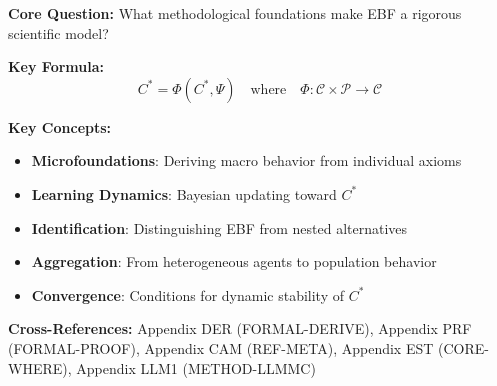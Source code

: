 \begin{abstract}
This appendix addresses five fundamental methodological challenges in constructing
EBF: (1) Microfoundations---how axioms derive from primitive assumptions;
(2) Learning Theory---how agents form and update expectations;
(3) Dynamic Adjustment---how systems converge to reference structure $C^*$;
(4) Heterogeneity and Aggregation---how individual differences scale;
(5) Identification and Model Comparison---how to distinguish EBF from alternatives.
These foundations ensure EBF meets rigorous standards of economic methodology.
\end{abstract}

\begin{tcolorbox}[colback=blue!5!white, colframe=blue!75!black,
    title=Quick Reference: METHOD-CONSTRUCT]

\textbf{Core Question:} What methodological foundations make EBF a rigorous scientific model?

\textbf{Key Formula:}
\begin{equation}
C^* = \Phi(C^*, \Psi) \quad \text{where} \quad \Phi: \mathcal{C} \times \mathcal{P} \to \mathcal{C}
\end{equation}

\textbf{Key Concepts:}
\begin{itemize}[nosep]
\item \textbf{Microfoundations}: Deriving macro behavior from individual axioms
\item \textbf{Learning Dynamics}: Bayesian updating toward $C^*$
\item \textbf{Identification}: Distinguishing EBF from nested alternatives
\item \textbf{Aggregation}: From heterogeneous agents to population behavior
\item \textbf{Convergence}: Conditions for dynamic stability of $C^*$
\end{itemize}

\textbf{Cross-References:} Appendix DER (FORMAL-DERIVE), Appendix PRF (FORMAL-PROOF),
Appendix CAM (REF-META), Appendix EST (CORE-WHERE), Appendix LLM1 (METHOD-LLMMC)
\end{tcolorbox}



